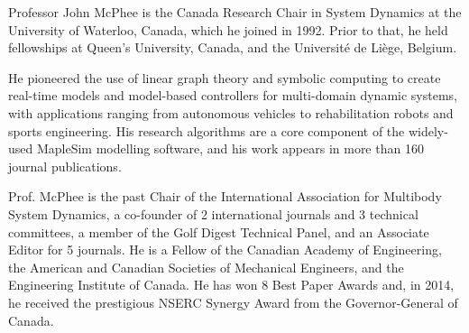 \documentclass{ieeeaccess}
\begin{document}
\begin{IEEEbiography}{Professor John McPhee} is the Canada Research Chair in System Dynamics at the University of Waterloo, Canada, which he joined in 1992. Prior to that, he held fellowships at Queen’s University, Canada, and the Université de Liège, Belgium.  

He pioneered the use of linear graph theory and symbolic computing to create real-time models and model-based controllers for multi-domain dynamic systems, with applications ranging from autonomous vehicles to rehabilitation robots and sports engineering. His research algorithms are a core component of the widely-used MapleSim modelling software, and his work appears in more than 160 journal publications. 

Prof. McPhee is the past Chair of the International Association for Multibody System Dynamics, a co-founder of 2 international journals and 3 technical committees, a member of the Golf Digest Technical Panel, and an Associate Editor for 5 journals. He is a Fellow of the Canadian Academy of Engineering, the American and Canadian Societies of Mechanical Engineers, and the Engineering Institute of Canada.  He has won 8 Best Paper Awards and, in 2014, he received the prestigious NSERC Synergy Award from the Governor-General of Canada. 
\end{IEEEbiography}

\EOD
\end{document}
